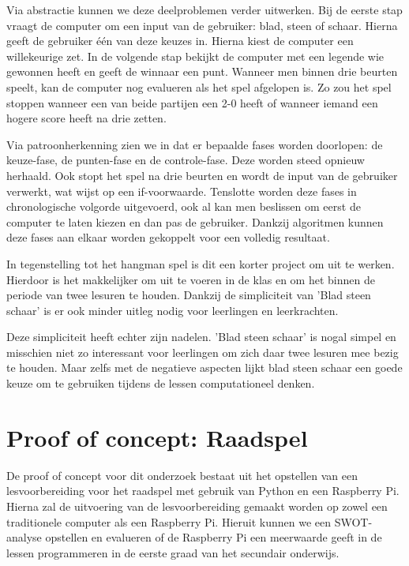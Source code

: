 Via abstractie kunnen we deze deelproblemen verder uitwerken. Bij de eerste stap vraagt de computer om een input van de gebruiker: blad, steen of schaar. Hierna geeft de gebruiker één van deze keuzes in. Hierna kiest de computer een willekeurige zet. In de volgende stap bekijkt de computer met een legende wie gewonnen heeft en geeft de winnaar een punt. Wanneer men binnen drie beurten speelt, kan de computer nog evalueren als het spel afgelopen is. Zo zou het spel stoppen wanneer een van beide partijen een 2-0 heeft of wanneer iemand een hogere score heeft na drie zetten.

Via patroonherkenning zien we in dat er bepaalde fases worden doorlopen: de keuze-fase, de punten-fase en de controle-fase. Deze worden steed opnieuw herhaald. Ook stopt het spel na drie beurten en wordt de input van de gebruiker verwerkt, wat wijst op een if-voorwaarde. Tenslotte worden deze fases in chronologische volgorde uitgevoerd, ook al kan men beslissen om eerst de computer te laten kiezen en dan pas de gebruiker.
Dankzij algoritmen kunnen deze fases aan elkaar worden gekoppelt voor een volledig resultaat. 

In tegenstelling tot het hangman spel is dit een korter project om uit te werken. Hierdoor is het makkelijker om uit te voeren in de klas en om het binnen de periode van twee lesuren te houden. Dankzij de simpliciteit van 'Blad steen schaar' is er ook minder uitleg nodig voor leerlingen en leerkrachten.

Deze simpliciteit heeft echter zijn nadelen. 'Blad steen schaar' is nogal simpel en misschien niet zo interessant voor leerlingen om zich daar twee lesuren mee bezig te houden. Maar zelfs met de negatieve aspecten lijkt blad steen schaar een goede keuze om te gebruiken tijdens de lessen computationeel denken.

\section{Proof of concept: Raadspel}

De proof of concept voor dit onderzoek bestaat uit het opstellen van een lesvoorbereiding voor het raadspel met gebruik van Python en een Raspberry Pi. Hierna zal de uitvoering van de lesvoorbereiding gemaakt worden op zowel een traditionele computer als een Raspberry Pi. Hieruit kunnen we een SWOT-analyse opstellen en evalueren of de Raspberry Pi een meerwaarde geeft in de lessen programmeren in de eerste graad van het secundair onderwijs.

